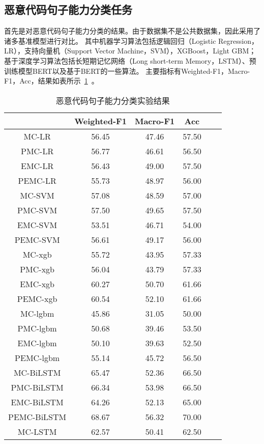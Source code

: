 \subsection{恶意代码句子能力分类任务}
首先是对恶意代码句子能力分类的结果。由于数据集不是公共数据集，因此采用了诸多基准模型进行对比。
其中机器学习算法包括逻辑回归（Logistic Regression，LR），支持向量机（Support Vector Machine，SVM），XGBoost，Light GBM；
基于深度学习算法包括长短期记忆网络（Long short-term Memory，LSTM）、预训练模型BERT以及基于BERT的一些算法。
主要指标有Weighted-F1，Macro-F1，Acc，结果如表所示~\ref{tab:mainmultclass}~。 
\begin{table}[htb]
	\renewcommand{\arraystretch}{1.3}
	\caption{恶意代码句子能力分类实验结果}
	\label{tab:mainmultclass}
	\vspace{0.5em}\centering\wuhao
	\begin{tabular}{c c c c c c }
		\toprule[1.5pt]  & Weighted-F1 & Macro-F1 & Acc \\
		\midrule[1pt] 
		MC-LR & 56.45 & 47.46 & 57.50 \\
		PMC-LR & 56.77 & 46.61 & 56.50 \\
		EMC-LR & 56.43 & 49.00 & 57.50 \\
		PEMC-LR & 55.73 & 48.97 & 56.00 \\
		MC-SVM & 57.08 & 48.59 & 57.00 \\
		PMC-SVM & 57.50 & 49.65 & 57.50 \\
		EMC-SVM & 53.51 & 46.71 & 54.00 \\
		PEMC-SVM & 56.61 & 49.17 & 56.00 \\
		MC-xgb & 55.72 & 43.95 & 57.33 \\
		PMC-xgb & 56.04 & 43.79 & 57.33 \\
		EMC-xgb & 60.27 & 50.70 & 61.66 \\
		PEMC-xgb & 60.54 & 52.10 & 61.66 \\
		MC-lgbm & 45.86 & 31.05 & 50.00 \\
		PMC-lgbm & 50.68 & 39.46 & 53.50 \\
		EMC-lgbm & 50.10 & 39.63 & 52.50 \\
		PEMC-lgbm & 55.14 & 45.72 & 56.50 \\
		MC-BiLSTM & 65.47 & 52.36 & 66.50 \\
		PMC-BiLSTM & 66.34 & 53.98 & 66.50 \\
		EMC-BiLSTM & 64.26 & 52.13 & 65.00 \\
		PEMC-BiLSTM & 68.67 & 56.32 & 70.00 \\
		MC-LSTM & 62.57 & 50.41 & 62.50 \\

\end{tabular}
\end{table}
